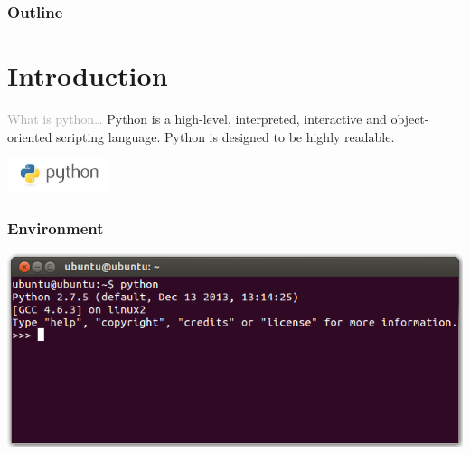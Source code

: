 \documentclass{../py-lecture}
\subtitle{Introduction}
\begin{document}
\begin{frame}
  \titlepage{}
\end{frame}
\begin{frame}
  \frametitle{Outline}
  \tableofcontents{}
\end{frame}

\section{Introduction}

\begin{frame}
  \begin{block}{
      \centering\textcolor{darkgray}{What is python\ldots}}
      Python is a high-level, interpreted, interactive and object-oriented scripting language. Python is designed to be highly readable.
  \end{block}
  \vspace{.75cm}
  \hspace*{8.5cm}\includegraphics[width=3cm]{img/python.jpg}
\end{frame}

\begin{frame}
	\frametitle{Environment}
	\includegraphics[width=\linewidth]{img/python-console-linux.png}
\end{frame}
\end{document}
